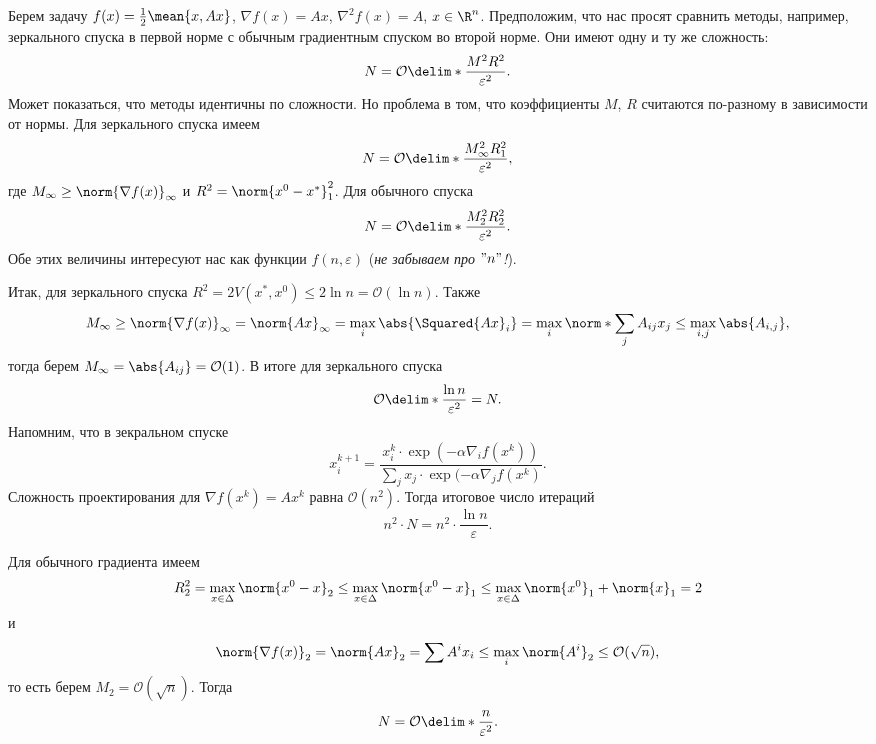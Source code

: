 Берем задачу $f(x) = \frac{1}{2} \mean{x, Ax}$, $\nabla f(x) = Ax$, $\nabla^2 f(x) = A$, $x \in \R^n$. Предположим, что нас просят сравнить методы, например, зеркального спуска в первой норме с обычным градиентным спуском во второй норме. Они имеют одну и ту же сложность:
\begin{equation*}
    N = \mathcal{O}\delim*{\frac{M^2R^2}{\varepsilon^2}}.
\end{equation*}
Может показаться, что методы идентичны по сложности. Но проблема в том, что коэффициенты $M$, $R$ считаются по-разному в зависимости от нормы. Для зеркального спуска имеем
\begin{equation*}
    N = \mathcal{O} \delim*{\frac{M^2_\infty R^2_1}{\varepsilon^2}},
\end{equation*}
где $M_\infty \geq \norm{\nabla f(x)}_\infty$ и $R^2 = \norm{x^0 - x^*}_1^2$. Для обычного спуска
\begin{equation*}
    N = \mathcal{O} \delim*{\frac{M_2^2R_2^2}{\varepsilon^2}}.
\end{equation*}
Обе этих величины интересуют нас как функции $f(n, \varepsilon)$ (\textit{не забываем про $"n"{}$!}).

Итак, для зеркального спуска $R^2 = 2V(x^*, x^0) \leq 2\ln n = \mathcal{O}(\ln n)$. Также
\begin{equation*}
    M_\infty \geq \norm{\nabla f(x)}_\infty = \norm{Ax}_\infty = \max_i \abs{\Squared{Ax}_i} = \max_i \norm*{\sum_j A_{ij} x_j} \leq \max_{i, j} \abs{A_{i, j}},
\end{equation*}
тогда берем $M_\infty = \abs{A_{ij}} = \mathcal{O}(1)$.
В итоге для зеркального спуска
\begin{equation*}
    \mathcal{O}\delim*{\frac{\ln n}{\varepsilon^2}} = N.
\end{equation*}
Напомним, что в зекральном спуске
\begin{equation*}
    x^{k + 1}_i = \frac{x^k_i \cdot \exp (- \alpha \nabla_i f(x^k))}{\sum_{j} x_j \cdot \exp(-\alpha \nabla_j f(x^k)}.
\end{equation*}
Сложность проектирования для $\nabla f(x^k) = Ax^k$ равна $\mathcal{O}(n^2)$. Тогда итоговое число итераций
\begin{equation*}
    n^2\cdot N = n^2 \cdot \frac{\ln n}{\varepsilon}.
\end{equation*}

Для обычного градиента имеем
\begin{equation*}
    R^2_2 = \max_{x \in \Delta} \norm{x^0 - x}_2 \leq \max_{x \in \Delta} \norm{x^0 - x}_1 \leq \max_{x\in \Delta} \norm{x^0}_1 + \norm{x}_1 = 2
\end{equation*}
и
\begin{equation*}
    \norm{\nabla f(x)}_2 = \norm{Ax}_2 = \sum A^i x_i \leq \max_i \norm{A^i}_2 \leq \mathcal{O}(\sqrt n),
\end{equation*}
то есть берем $M_2 = \mathcal{O}(\sqrt n)$.
Тогда
\begin{equation*}
    N = \mathcal{O}\delim*{\frac{n}{\varepsilon^2}}.
\end{equation*}